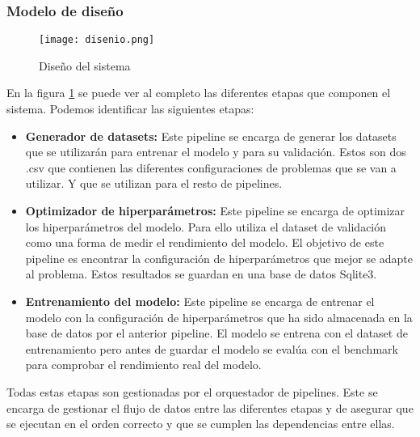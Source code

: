 \subsubsection{Modelo de diseño}
\begin{figure}[ht]
    \centering
    \texttt{[image: disenio.png]}
    \caption{Diseño del sistema}
    \label{fig:desing}
\end{figure}

En la figura \ref{fig:desing} se puede ver al completo las diferentes etapas que componen
el sistema. Podemos identificar las siguientes etapas:
\begin{itemize}
    \item \textbf{Generador de datasets: } Este pipeline se encarga de generar los datasets
    que se utilizarán para entrenar el modelo y para su validación. Estos son dos .csv que
    contienen las diferentes configuraciones de problemas que se van a utilizar. Y que se
    utilizan para el resto de pipelines.
    \item \textbf{Optimizador de hiperparámetros: } Este pipeline se encarga de optimizar
    los hiperparámetros del modelo. Para ello utiliza el dataset de validación como una
    forma de medir el rendimiento del modelo. El objetivo de este pipeline es encontrar
    la configuración de hiperparámetros que mejor se adapte al problema. Estos resultados
    se guardan en una base de datos Sqlite3.
    \item \textbf{Entrenamiento del modelo: } Este pipeline se encarga de entrenar el modelo
    con la configuración de hiperparámetros que ha sido almacenada en la base de datos por el
    anterior pipeline. El modelo se entrena con el dataset de entrenamiento pero antes de
    guardar el modelo se evalúa con el benchmark para comprobar el rendimiento real del modelo.
\end{itemize} 

Todas estas etapas son gestionadas por el orquestador de pipelines. Este se encarga de
gestionar el flujo de datos entre las diferentes etapas y de asegurar que se ejecutan en
el orden correcto y que se cumplen las dependencias entre ellas.